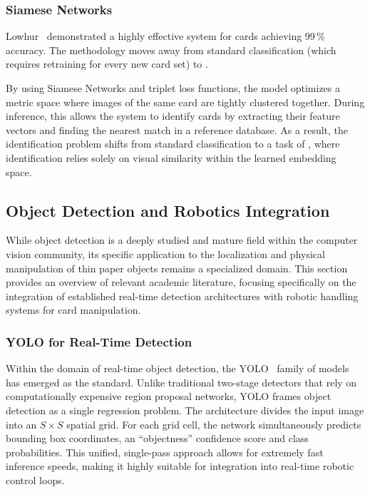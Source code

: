 \subsubsection{Siamese Networks}
Lowhur~\cite{rosebrock2021lowhur} demonstrated a highly effective system for  cards achieving 99\,\% accuracy. The methodology moves away from standard classification (which requires retraining for every new card set) to . 

By using Siamese Networks and triplet loss functions, the model optimizes a metric space where images of the same card are tightly clustered together. During inference, this allows the system to identify cards by extracting their feature vectors and finding the nearest match in a reference database. As a result, the identification problem shifts from standard classification to a task of , where identification relies solely on visual similarity within the learned embedding space.

\subsection{Object Detection and Robotics Integration}
While object detection is a deeply studied and mature field within the computer vision community, its specific application to the localization and physical manipulation of thin paper objects remains a specialized domain. This section provides an overview of relevant academic literature, focusing specifically on the integration of established real-time detection architectures with robotic handling systems for card manipulation.

\subsubsection{\acs{YOLO} for Real-Time Detection}
Within the domain of real-time object detection, the \acf{YOLO}~\cite{redmon2016yolo} family of models has emerged as the  standard. Unlike traditional two-stage detectors that rely on computationally expensive region proposal networks, \ac{YOLO} frames object detection as a single regression problem. The architecture divides the input image into an $S \times S$ spatial grid. For each grid cell, the network simultaneously predicts bounding box coordinates, an \enquote{objectness} confidence score and class probabilities. This unified, single-pass approach allows for extremely fast inference speeds, making it highly suitable for integration into real-time robotic control loops.

